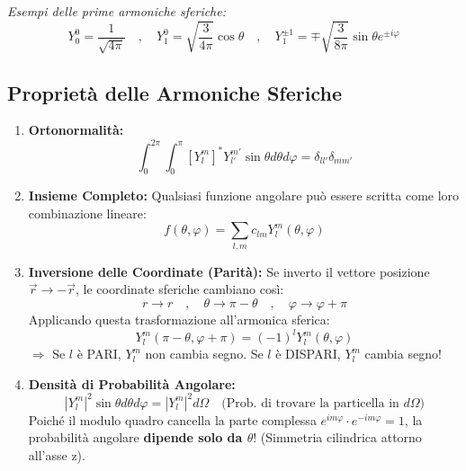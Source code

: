 \documentclass[11pt, a4paper]{article}
\begin{document}
\textit{Esempi delle prime armoniche sferiche:} %
\begin{equation*}
    Y_0^0 = \frac{1}{\sqrt{4\pi}} \quad , \quad Y_1^0 = \sqrt{\frac{3}{4\pi}}\cos\theta \quad , \quad Y_1^{\pm 1} = \mp \sqrt{\frac{3}{8\pi}}\sin\theta e^{\pm i\varphi} %
\end{equation*}

\subsection{Proprietà delle Armoniche Sferiche} %

\begin{enumerate}
    \item \textbf{Ortonormalità:} %
    \begin{equation*}
        \int_0^{2\pi} \int_0^\pi \left[ Y_l^m \right]^* Y_{l'}^{m'} \sin\theta d\theta d\varphi = \delta_{ll'} \delta_{mm'} %
    \end{equation*}
    
    \item \textbf{Insieme Completo:} Qualsiasi funzione angolare può essere scritta come loro combinazione lineare: %
    \begin{equation*}
        f(\theta, \varphi) = \sum_{l,m} c_{lm} Y_l^m(\theta, \varphi) %
    \end{equation*}
    
    \item \textbf{Inversione delle Coordinate (Parità):} %
    Se inverto il vettore posizione $\vec{r} \to -\vec{r}$, le coordinate sferiche cambiano così: %
    \begin{equation*}
        r \to r \quad , \quad \theta \to \pi - \theta \quad , \quad \varphi \to \varphi + \pi %
    \end{equation*}
    Applicando questa trasformazione all'armonica sferica: %
    \begin{equation*}
        Y_l^m(\pi - \theta, \varphi + \pi) = (-1)^l Y_l^m(\theta, \varphi) %
    \end{equation*}
    $\Rightarrow$ Se $l$ è PARI, $Y_l^m$ non cambia segno. Se $l$ è DISPARI, $Y_l^m$ cambia segno! %
    
    \item \textbf{Densità di Probabilità Angolare:} %
    \begin{equation*}
        |Y_l^m|^2 \sin\theta d\theta d\varphi = |Y_l^m|^2 d\Omega \quad \text{(Prob. di trovare la particella in } d\Omega\text{)} %
    \end{equation*}
    Poiché il modulo quadro cancella la parte complessa $e^{im\varphi} \cdot e^{-im\varphi} = 1$, la probabilità angolare \textbf{dipende solo da $\theta$}! (Simmetria cilindrica attorno all'asse z). %
\end{enumerate}
\end{document}
